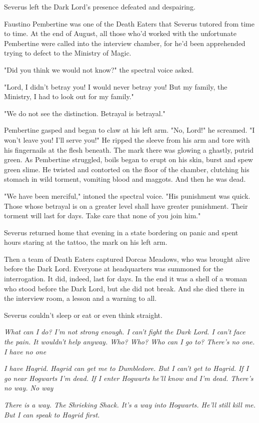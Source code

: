 Severus left the Dark Lord's presence defeated and despairing.

Faustino Pembertine was one of the Death Eaters that Severus tutored from time to time. At the end of August, all those who'd worked with the unfortunate Pembertine were called into the interview chamber, for he'd been apprehended trying to defect to the Ministry of Magic.

"Did you think we would not know?" the spectral voice asked.

"Lord, I didn't betray you! I would never betray you! But my family, the Ministry, I had to look out for my family."

"We do not see the distinction. Betrayal is betrayal."

Pembertine gasped and began to claw at his left arm. "No, Lord!" he screamed. "I won't leave you! I'll serve you!" He ripped the sleeve from his arm and tore with his fingernails at the flesh beneath. The mark there was glowing a ghastly, putrid green. As Pembertine struggled, boils began to erupt on his skin, burst and spew green slime. He twisted and contorted on the floor of the chamber, clutching his stomach in wild torment, vomiting blood and maggots. And then he was dead.

"We have been merciful," intoned the spectral voice. "His punishment was quick. Those whose betrayal is on a greater level shall have greater punishment. Their torment will last for days. Take care that none of you join him."

Severus returned home that evening in a state bordering on panic and spent hours staring at the tattoo, the mark on his left arm.

Then a team of Death Eaters captured Dorcas Meadows, who was brought alive before the Dark Lord. Everyone at headquarters was summoned for the interrogation. It did, indeed, last for days. In the end it was a shell of a woman who stood before the Dark Lord, but she did not break. And she died there in the interview room, a lesson and a warning to all.

Severus couldn't sleep or eat or even think straight.

\emph{What can I do? I'm not strong enough. I can't fight the Dark Lord. I can't face the pain. It wouldn't help anyway. Who? Who? Who can I go to? There's no one. I have no one{\el}}

\emph{I have Hagrid. Hagrid can get me to Dumbledore. But I can't get to Hagrid. If I go near Hogwarts I'm dead. If I enter Hogwarts he'll know and I'm dead. There's no way. No way{\el}}

\emph{There is a way. The Shrieking Shack. It's a way into Hogwarts. He'll still kill me. But I can speak to Hagrid first.} 


